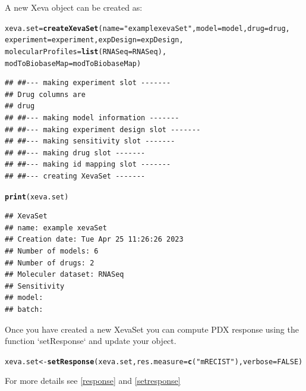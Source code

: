 \documentclass{article}\usepackage[]{graphicx}\usepackage[]{xcolor}
\makeatletter
\newcommand{\hlnum}[1]{\textcolor[rgb]{0.686,0.059,0.569}{#1}}%
\newcommand{\hlstr}[1]{\textcolor[rgb]{0.192,0.494,0.8}{#1}}%
\newcommand{\hlstd}[1]{\textcolor[rgb]{0.345,0.345,0.345}{#1}}%
\newcommand{\hlkwb}[1]{\textcolor[rgb]{0.69,0.353,0.396}{#1}}%
\newcommand{\hlkwc}[1]{\textcolor[rgb]{0.333,0.667,0.333}{#1}}%
\newcommand{\hlkwd}[1]{\textcolor[rgb]{0.737,0.353,0.396}{\textbf{#1}}}%
\newenvironment{kframe}{%
 \def\at@end@of@kframe{}%
 \ifinner\ifhmode%
  \def\at@end@of@kframe{\end{minipage}}%
  \begin{minipage}{\columnwidth}%
 \fi\fi%
 \def\FrameCommand##1{\hskip\@totalleftmargin \hskip-\fboxsep
 \colorbox{shadecolor}{##1}\hskip-\fboxsep
     \hskip-\linewidth \hskip-\@totalleftmargin \hskip\columnwidth}%
 \MakeFramed {\advance\hsize-\width
   \@totalleftmargin\z@ \linewidth\hsize
   \@setminipage}}%
 {\par\unskip\endMakeFramed%
 \at@end@of@kframe}
\newenvironment{knitrout}{}{} %
\makeatother
\begin{document}
A new Xeva object can be created as:
\begin{knitrout}
\color{fgcolor}\begin{kframe}
\begin{alltt}
\hlstd{xeva.set}\hlkwb{=}\hlkwd{createXevaSet}\hlstd{(}\hlkwc{name}\hlstd{=}\hlstr{"example xevaSet"}\hlstd{,} \hlkwc{model}\hlstd{=model,} \hlkwc{drug}\hlstd{=drug,}
                       \hlkwc{experiment}\hlstd{=experiment,} \hlkwc{expDesign}\hlstd{=expDesign,}
                       \hlkwc{molecularProfiles}\hlstd{=}\hlkwd{list}\hlstd{(}\hlkwc{RNASeq} \hlstd{= RNASeq),}
                       \hlkwc{modToBiobaseMap} \hlstd{= modToBiobaseMap)}
\end{alltt}
\begin{verbatim}
## ##--- making experiment slot -------
## Drug columns are
## drug
## ##--- making model information -------
## ##--- making experiment design slot -------
## ##--- making sensitivity slot -------
## ##--- making drug slot -------
## ##--- making id mapping slot -------
## ##--- creating XevaSet -------
\end{verbatim}
\begin{alltt}
\hlkwd{print}\hlstd{(xeva.set)}
\end{alltt}
\begin{verbatim}
## XevaSet
## name: example xevaSet
## Creation date: Tue Apr 25 11:26:26 2023
## Number of models: 6
## Number of drugs: 2
## Moleculer dataset: RNASeq
## Sensitivity
## model:
## batch:
\end{verbatim}
\end{kframe}
\end{knitrout}


Once you have created a new XevaSet you can compute PDX response using the function `setResponse`
and update your object.

\begin{knitrout}
\color{fgcolor}\begin{kframe}
\begin{alltt}
\hlstd{xeva.set}  \hlkwb{<-} \hlkwd{setResponse}\hlstd{(xeva.set,} \hlkwc{res.measure} \hlstd{=} \hlkwd{c}\hlstd{(}\hlstr{"mRECIST"}\hlstd{),} \hlkwc{verbose}\hlstd{=}\hlnum{FALSE}\hlstd{)}
\end{alltt}
\end{kframe}
\end{knitrout}

For more details see \ref{response} and \ref{setresponse}
\newpage

\end{document}
